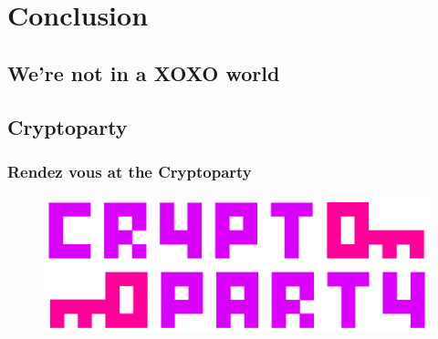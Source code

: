 \documentclass{beamer}
\begin{document}
\section{Conclusion}
\subsection{We're not in a XOXO world}



\subsection{Cryptoparty}



\begin{frame}
\frametitle{Rendez vous at the Cryptoparty}
\begin{figure}
\includegraphics[width=0.8\linewidth]{./materials/cryptoparty.jpg}
\end{figure}
\end{frame}
\end{document}
